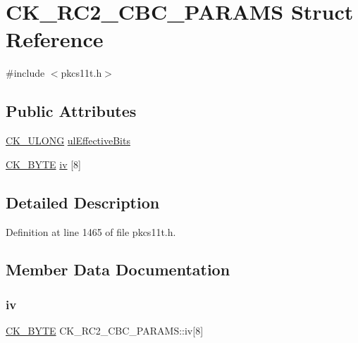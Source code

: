 \hypertarget{struct_c_k___r_c2___c_b_c___p_a_r_a_m_s}{}\section{C\+K\+\_\+\+R\+C2\+\_\+\+C\+B\+C\+\_\+\+P\+A\+R\+A\+MS Struct Reference}
\label{struct_c_k___r_c2___c_b_c___p_a_r_a_m_s}


{\ttfamily \#include $<$pkcs11t.\+h$>$}

\subsection*{Public Attributes}
\begin{DoxyCompactItemize}
\item 
\hyperlink{pkcs11t_8h_a35181858a3b7a0a81f49d180d8f446ef}{C\+K\+\_\+\+U\+L\+O\+NG} \hyperlink{struct_c_k___r_c2___c_b_c___p_a_r_a_m_s_aad0053a19c1f9bf50d50a5f2390832c3}{ul\+Effective\+Bits}
\item 
\hyperlink{pkcs11t_8h_a51e605f881c86838bf12d70707b57b85}{C\+K\+\_\+\+B\+Y\+TE} \hyperlink{struct_c_k___r_c2___c_b_c___p_a_r_a_m_s_ae1a967f8d5312ef0705687af3237231c}{iv} \mbox{[}8\mbox{]}
\end{DoxyCompactItemize}


\subsection{Detailed Description}


Definition at line 1465 of file pkcs11t.\+h.



\subsection{Member Data Documentation}
\mbox{\label{struct_c_k___r_c2___c_b_c___p_a_r_a_m_s_ae1a967f8d5312ef0705687af3237231c}} 
\subsubsection{\texorpdfstring{iv}{iv}}
{\footnotesize\ttfamily \hyperlink{pkcs11t_8h_a51e605f881c86838bf12d70707b57b85}{C\+K\+\_\+\+B\+Y\+TE} C\+K\+\_\+\+R\+C2\+\_\+\+C\+B\+C\+\_\+\+P\+A\+R\+A\+M\+S\+::iv\mbox{[}8\mbox{]}}



